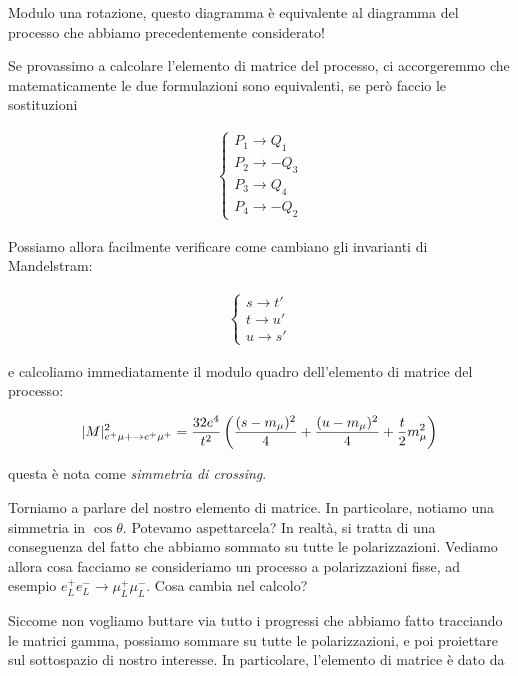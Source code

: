 \documentclass[11pt]{report}
\begin{document}
Modulo una rotazione, questo diagramma è equivalente al diagramma del processo che abbiamo precedentemente considerato!

Se provassimo a calcolare l'elemento di matrice del processo, ci accorgeremmo che matematicamente le due formulazioni sono equivalenti, se però faccio le sostituzioni 

\begin{align}
    \begin{cases}
        P_1 \rightarrow Q_1 \\
        P_2 \rightarrow -Q_3 \\
        P_3 \rightarrow Q_4 \\
        P_4 \rightarrow -Q_2 
    \end{cases}
\end{align}

Possiamo allora facilmente verificare come cambiano gli invarianti di Mandelstram: 

\begin{align}
    \begin{cases}
        s \rightarrow t' \\
        t \rightarrow u' \\
        u \rightarrow s'
    \end{cases}
\end{align}

e calcoliamo immediatamente il modulo quadro dell'elemento di matrice del processo:

\begin{align}
    \lvert M\rvert^2_{e^+\mu+ \rightarrow e^+\mu^+} = \frac{32e^4}{t^2}\left(\frac{(s-m_\mu)^2}{4} + \frac{(u-m_\mu)^2}{4} +\frac{t}{2}m_\mu^2 \right)
\end{align}

questa è nota come \emph{simmetria di crossing}. 

Torniamo a parlare del nostro elemento di matrice. In particolare, notiamo una simmetria in \(\cos\theta\). Potevamo aspettarcela? In realtà, si tratta di una conseguenza del fatto che abbiamo sommato su tutte le polarizzazioni. Vediamo allora cosa facciamo se consideriamo un processo a polarizzazioni fisse, ad esempio \(e^+_Le^-_L \rightarrow \mu^+_L\mu^-_L\). Cosa cambia nel calcolo? 

Siccome non vogliamo buttare via tutto i progressi che abbiamo fatto tracciando le matrici gamma, possiamo sommare su tutte le polarizzazioni, e poi proiettare sul sottospazio di nostro interesse. In particolare, l'elemento di matrice è dato da 
\end{document}

